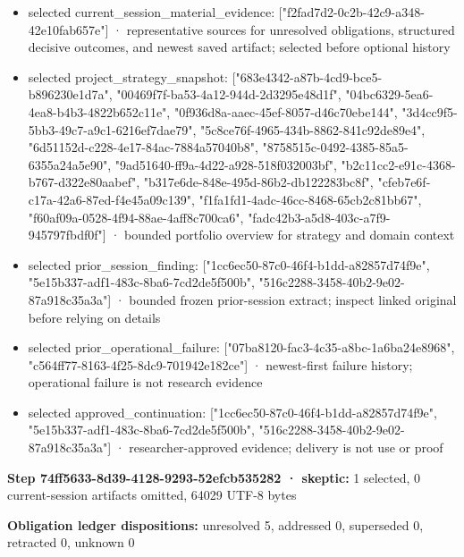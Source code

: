 \documentclass[11pt]{article}
\begin{document}
\begin{itemize}
\item selected current\_session\_material\_evidence: ["f2fad7d2-0c2b-42c9-a348-42e10fab657e"] · representative sources for unresolved obligations, structured decisive outcomes, and newest saved artifact; selected before optional history
\item selected project\_strategy\_snapshot: ["683e4342-a87b-4cd9-bce5-b896230e1d7a", "00469f7f-ba53-4a12-944d-2d3295e48d1f", "04bc6329-5ea6-4ea8-b4b3-4822b652c11e", "0f936d8a-aaec-45ef-8057-d46c70ebe144", "3d4cc9f5-5bb3-49c7-a9c1-6216ef7dae79", "5c8ce76f-4965-434b-8862-841c92de89e4", "6d51152d-c228-4e17-84ac-7884a57040b8", "8758515c-0492-4385-85a5-6355a24a5e90", "9ad51640-ff9a-4d22-a928-518f032003bf", "b2c11cc2-e91c-4368-b767-d322e80aabef", "b317e6de-848e-495d-86b2-db122283bc8f", "cfeb7e6f-c17a-42a6-87ed-f4e45a09c139", "f1fa1fd1-4adc-46cc-8468-65cb2c81bb67", "f60af09a-0528-4f94-88ae-4aff8c700ca6", "fadc42b3-a5d8-403c-a7f9-945797fbdf0f"] · bounded portfolio overview for strategy and domain context
\item selected prior\_session\_finding: ["1cc6ec50-87c0-46f4-b1dd-a82857d74f9e", "5e15b337-adf1-483c-8ba6-7cd2de5f500b", "516c2288-3458-40b2-9e02-87a918c35a3a"] · bounded frozen prior-session extract; inspect linked original before relying on details
\item selected prior\_operational\_failure: ["07ba8120-fac3-4c35-a8bc-1a6ba24e8968", "c564ff77-8163-4f25-8dc9-701942e182ce"] · newest-first failure history; operational failure is not research evidence
\item selected approved\_continuation: ["1cc6ec50-87c0-46f4-b1dd-a82857d74f9e", "5e15b337-adf1-483c-8ba6-7cd2de5f500b", "516c2288-3458-40b2-9e02-87a918c35a3a"] · researcher-approved evidence; delivery is not use or proof
\end{itemize}
\textbf{Step 74ff5633-8d39-4128-9293-52efcb535282 · skeptic:} 1 selected, 0 current-session artifacts omitted, 64029 UTF-8 bytes\par
\textbf{Obligation ledger dispositions:} unresolved 5, addressed 0, superseded 0, retracted 0, unknown 0\par
\end{document}
